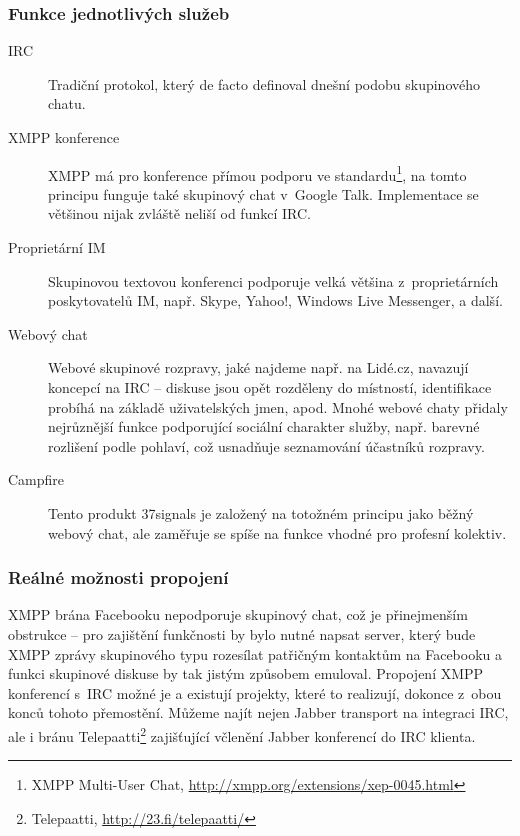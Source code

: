 \documentclass[12pt,oneside,final]{fithesis2}
\begin{document}
\subsubsection*{Funkce jednotlivých služeb}
\begin{description}
    \item[IRC]
        Tradiční protokol, který de facto definoval dnešní podobu skupinového chatu.

    \item[XMPP konference]
        XMPP má pro konference přímou podporu ve standardu\footnote{XMPP Multi-User Chat, \url{http://xmpp.org/extensions/xep-0045.html}}, na tomto principu funguje také skupinový chat v~Google Talk. Implementace se většinou nijak zvláště neliší od funkcí IRC.

    \item[Proprietární IM]
        Skupinovou textovou konferenci podporuje velká většina z~proprietárních poskytovatelů IM, např. Skype, Yahoo!, Windows Live Messenger, a další.

    \item[Webový chat]
        Webové skupinové rozpravy, jaké najdeme např. na Lidé.cz, navazují koncepcí na IRC -- diskuse jsou opět rozděleny do místností, identifikace probíhá na základě uživatelských jmen, apod. Mnohé webové chaty přidaly nejrůznější funkce podporující sociální charakter služby, např. barevné rozlišení podle pohlaví, což usnadňuje seznamování účastníků rozpravy.

    \item[Campfire]
        Tento produkt 37signals je založený na totožném principu jako běžný webový chat, ale zaměřuje se spíše na funkce vhodné pro profesní kolektiv.
\end{description}

\subsubsection*{Reálné možnosti propojení}
XMPP brána Facebooku nepodporuje skupinový chat, což je přinejmenším obstrukce -- pro zajištění funkčnosti by bylo nutné napsat server, který bude XMPP zprávy skupinového typu rozesílat patřičným kontaktům na Facebooku a funkci skupinové diskuse by tak jistým způsobem emuloval. Propojení XMPP konferencí s~IRC možné je a existují projekty, které to realizují, dokonce z~obou konců tohoto přemostění. Můžeme najít nejen Jabber transport na integraci IRC, ale i bránu Telepaatti\footnote{Telepaatti, \url{http://23.fi/telepaatti/}} zajišťující včlenění Jabber konferencí do IRC klienta.
\end{document}
